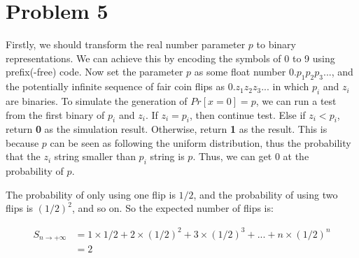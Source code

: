 \documentclass{article}
\begin{document}
\section{Problem 5}

Firstly, we should transform the real number parameter $p$ to binary representations. We can achieve this by encoding the symbols of 0 to 9 using prefix(-free) code. Now set the parameter $p$ as some float number $0.p_1p_2p_3...$, and the potentially infinite sequence of fair coin flips as $0.z_1z_2z_3...$ in which $p_i$ and $z_i$ are binaries. To simulate the generation of $Pr[x=0]=p$, we can run a test from the first binary of $p_i$ and $z_i$. If $z_i = p_i$, then continue test. Else if $z_i < p_i$, return \textbf{0} as the simulation result. Otherwise, return \textbf{1} as the result. This is because $p$ can be seen as following the uniform distribution, thus the probability that the $z_i$ string smaller than $p_i$ string is $p$. Thus, we can get $0$ at the probability of $p$.

The probability of only using one flip is $1/2$, and the probability of using two flips is $(1/2)^2$, and so on. So the expected number of flips is:

\begin{equation*}
\begin{split}
S_{n\rightarrow+\infty} &= 1\times1/2 + 2\times(1/2)^2 + 3\times(1/2)^3 + ... +n\times(1/2)^n\\
& =2\\
\end{split}
\end{equation*}
\end{document}
